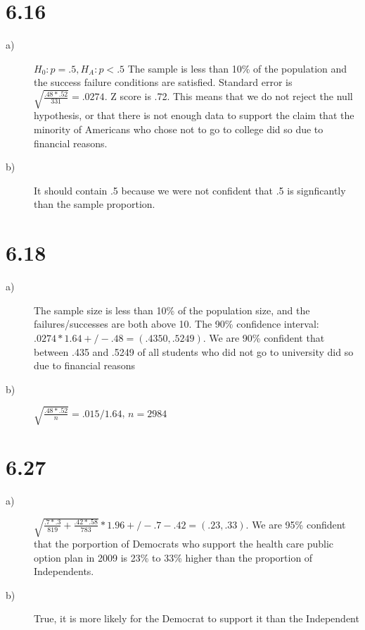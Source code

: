 \documentclass{article}
\begin{document}
\section*{6.16}
\begin{description}
    \item[a)] $H_0: p = .5, H_A: p < .5$ The sample is less than 10\% of the 
        population and the success failure conditions are satisfied. Standard error
        is $\sqrt{\frac{.48*.52}{331}} = .0274$. Z score is .72. This means that
        we do not reject the null hypothesis, or that there is not enough data 
        to support the claim that the minority of Americans who chose not to go 
        to college did so due to financial reasons.
    \item[b)] It should contain .5 because we were not confident that .5 is 
        signficantly than the sample proportion.
\end{description}
\section*{6.18}
\begin{description}
    \item[a)] The sample size is less than 10\% of the population size, and 
        the failures/successes are both above 10. The 90\% confidence 
        interval:$.0274 * 1.64 +/- .48 = (.4350, .5249)$. We are 90\% confident
        that between .435 and .5249 of all students who did not go to university
        did so due to financial reasons
    \item[b)] $\sqrt{\frac{.48*.52}{n}} = .015/1.64$, $n = 2984$
\end{description}

\section*{6.27}
\begin{description}
    \item[a)] $\sqrt{\frac{.7*.3}{819} + \frac{.42*.58}{783}} * 1.96 +/- .7 - .
        42 = (.23, .33)$. We are 95\% confident that the porportion of Democrats
        who support the health care public option plan in 2009 is 23\% to 33\%
        higher than the proportion of Independents.
    \item[b)] True, it is more likely for the Democrat to support it than the
        Independent
\end{description}
\end{document}
